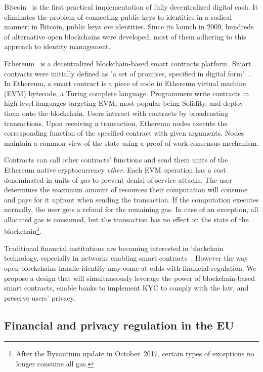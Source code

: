 Bitcoin~\cite{Nakamoto2008} is the first practical implementation of fully decentralized digital cash.
It eliminates the problem of connecting public keys to identities in a radical manner: in Bitcoin, public keys \textit{are} identities.
Since its launch in 2009, hundreds of alternative open blockchains were developed, most of them adhering to this approach to identity management.

Ethereum~\cite{Buterin2014, Wood2014} is a decentralized blockchain-based smart contracts platform.
Smart contracts were initially defined as "a set of promises, specified in digital form"~\cite{Szabo1996}.
In Ethereum, a smart contract is a piece of code in Ethereum virtual machine (EVM) bytecode, a Turing complete language.
Programmers write contracts in high-level languages targeting EVM, most popular being Solidity, and deploy them onto the blockchain.
Users interact with contracts by broadcasting transactions.
Upon receiving a transaction, Ethereum nodes execute the corresponding function of the specified contract with given arguments.
Nodes maintain a common view of the state using a proof-of-work consensus mechanism.

Contracts can call other contracts' functions and send them units of the Ethereum native cryptocurrency \textit{ether}.
Each EVM operation has a cost denominated in units of \textit{gas} to prevent denial-of-service attacks.
The user determines the maximum amount of resources their computation will consume and pays for it upfront when sending the transaction.
If the computation executes normally, the user gets a refund for the remaining gas.
In case of an exception, all allocated gas is consumed, but the transaction has no effect on the state of the blockchain\footnote{After the Byzantium update in October~2017, certain types of exceptions no longer consume all gas.}.


Traditional financial institutions are becoming interested in blockchain technology, especially in networks enabling smart contracts~\cite{Castillo2017}.
However the way open blockchains handle identity may come at odds with financial regulation.
We propose a design that will simultaneously leverage the power of blockchain-based smart contracts, enable banks to implement KYC to comply with the law, and preserve users' privacy.


\subsection{Financial and privacy regulation in the EU} \label{sec:Ch12KYCEU}

